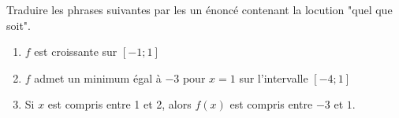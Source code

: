 
Traduire les phrases suivantes par les un énoncé contenant la locution "quel que soit".

\begin{enumerate}
\item $f$ est croissante sur $[-1;1]$
\item $f$ admet un minimum égal à $-3$ pour $x=1$ sur l'intervalle $[-4;1]$
\item Si $x$ est compris entre 1 et 2, alors $f(x)$ est compris entre $-3$ et $1$.
\end{enumerate}